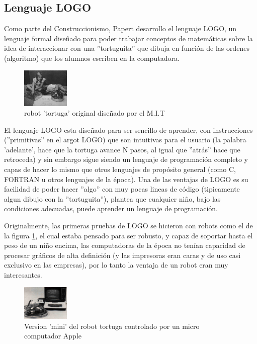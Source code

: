 \subsection{Lenguaje LOGO}

Como parte del Construccionismo, Papert desarrollo el lenguaje LOGO, un lenguaje formal \citet{giro_lenguaje_2015} diseñado para poder trabajar conceptos de matemáticas sobre la idea de interaccionar con una ''tortuguita'' que dibuja en función de las ordenes (algoritmo) que los alumnos escriben en la computadora.

\begin{figure}
  \begin{center}
    \includegraphics[width=0.2\textwidth]{figuras/logo_robot.jpg}
    \caption[Caption for LOF]{robot 'tortuga' original diseñado por el M.I.T}
    
    \label{fig:tortuga_mit}
  \end{center}
\end{figure}
El lenguaje LOGO esta diseñado para ser sencillo de aprender, con instrucciones (''primitivas'' en el argot LOGO) que son intuitivas para el usuario (la palabra 'adelante', hace que la tortuga avance N pasos,  al igual que ''atrás'' hace que retroceda) y sin embargo sigue siendo un lenguaje de programación completo y capas de hacer lo mismo que otros lenguajes de propósito general  (como C, FORTRAN u otros lenguajes de la época). Una de las ventajas de LOGO es su facilidad de poder hacer ''algo'' con muy pocas lineas de código (tipicamente algun dibujo con la ''tortuguita''), \cite{seymour_papert_desafio_1987} plantea que cualquier niño, bajo las condiciones adecuadas, puede aprender un lenguaje de programación.

Originalmente, las primeras pruebas de LOGO se hicieron con robots como el de la figura \ref{fig:tortuga_mit}, el cual estaba pensado para ser robusto, y capaz de soportar hasta el peso de un niño encima, las computadoras de la época no tenían capacidad de procesar gráficos de alta definición (y las impresoras eran caras y de uso casi exclusivo en las empresas), por lo tanto la ventaja de un robot eran muy interesantes.

\begin{figure}
  \begin{center}
    \includegraphics[width=0.2\textwidth]{figuras/turtle_with_apple.JPG}
    \caption[Caption for LOF]{Version 'mini' del robot tortuga controlado por un micro computador Apple}
    
    \label{fig:tortuga_2}
  \end{center}
\end{figure}

